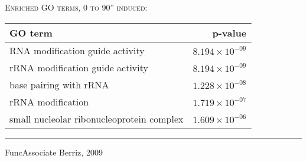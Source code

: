 \documentclass{beamer}
\begin{document}
\begin{frame}

    \textsc{Enriched GO terms, 0 to 90'' induced:}
    \begin{table}[ht]
        \centering
        \scriptsize
        \begin{tabular}{lr}
        \toprule
        \textbf{GO term} &\textbf{p-value} \\ 
        \midrule
        RNA modification guide activity & $8.194 \times 10^{-09}$ \\
        rRNA modification guide activity & $8.194 \times 10^{-09}$ \\
        base pairing with rRNA & $1.228 \times 10^{-08}$ \\
        rRNA modification & $1.719 \times 10^{-07}$ \\
        small nucleolar ribonucleoprotein complex & $1.609 \times 10^{-06}$ \\
        \bottomrule
    \end{tabular}

    \end{table}

    \vfill
    \relax
    \vskip 100pt
    \scriptsize
    \rule{\linewidth}{0.5pt}
    {FuncAssociate \hfill Berriz, 2009}
\end{frame}
\end{document}
